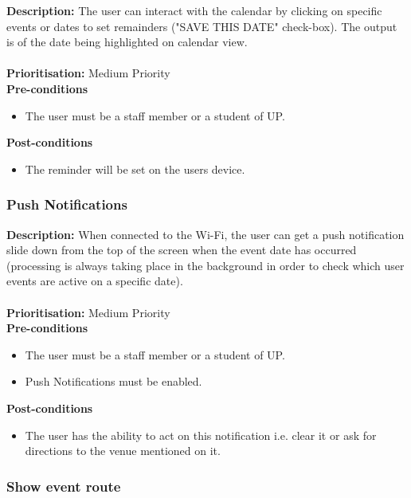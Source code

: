\documentclass[runningheads,a4paper]{article}
\begin{document}
\textbf{Description:} The user can interact with the calendar by clicking on specific events or dates to set remainders ("SAVE THIS DATE" check-box). The output is of the date being highlighted on calendar view.\\\\
\noindent
\textbf{Prioritisation:} Medium Priority\\
  
  
\textbf{Pre-conditions}
\begin{itemize}
	\item The user must be a staff member or a student of UP.
\end{itemize}
  
\textbf{Post-conditions}
\begin{itemize}
  	\item The reminder will be set on the users device.
\end{itemize}

\subsubsection{Push Notifications}

\textbf{Description:} When connected to the Wi-Fi, the user can get a push notification slide down from the top of the screen when the event date has occurred (processing is always taking place in the background in order to check which user events are active on a specific date).\\\\
\noindent
\textbf{Prioritisation:} Medium Priority\\
  
  
\textbf{Pre-conditions}
\begin{itemize}
	\item The user must be a staff member or a student of UP.
	\item Push Notifications must be enabled.
\end{itemize}
  
\textbf{Post-conditions}
\begin{itemize}
  	\item The user has the ability to act on this notification i.e. clear it or ask for directions to the venue mentioned on it.
\end{itemize}

\subsubsection{Show event route}
\end{document}

